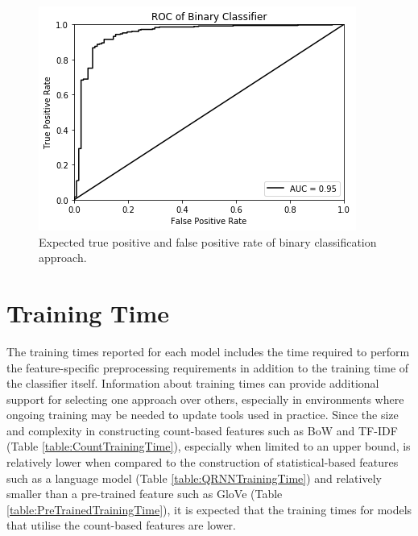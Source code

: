 \documentclass[a4paper,twoside,phd]{BYUPhys}
\begin{document}
\begin{figure}[H]
	\centering
	\includegraphics[totalheight=6cm]{images/binary-roc-curve.png}
	\caption{Expected true positive and false positive rate of binary classification approach.}
	\label{fig:BinaryPerformanceAUC}
\end{figure}



\section{Training Time}
\label{sec:TrainingTime}

The training times reported for each model includes the time required to perform the feature-specific preprocessing requirements in addition to the training time of the classifier itself. Information about training times can provide additional support for selecting one approach over others, especially in environments where ongoing training may be needed to update tools used in practice. Since the size and complexity in constructing count-based features such as BoW and TF-IDF (Table \ref{table:CountTrainingTime}), especially when limited to an upper bound, is relatively lower when compared to the construction of statistical-based features such as a language model (Table \ref{table:QRNNTrainingTime}) and relatively smaller than a pre-trained feature such as GloVe (Table \ref{table:PreTrainedTrainingTime}), it is expected that the training times for models that utilise the count-based features are lower.
\end{document}
